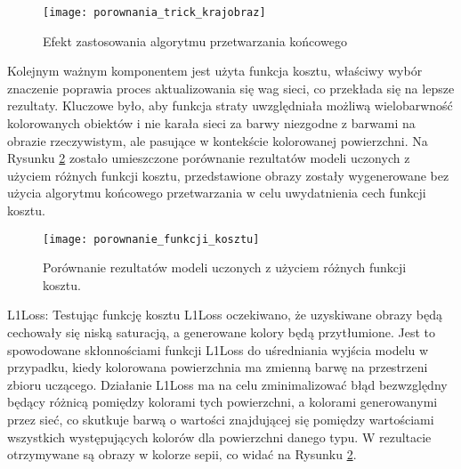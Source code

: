   \begin{figure}[H]
   \centering
   \captionsetup{justification=centering}
   \texttt{[image: porownania\_trick\_krajobraz]}
   \caption[Efekt zastosowania algorytmu przetwarzania końcowego - źródło
   rysunek własny na podstawie: \url{https://pl.wikipedia.org/wiki/Plik:PL_Bagno_Calowanie_2.jpg}]
   {Efekt zastosowania algorytmu przetwarzania końcowego}
   \label{fig:trick}
  \end{figure}

  Kolejnym ważnym komponentem jest użyta funkcja kosztu, właściwy wybór
  znaczenie poprawia proces aktualizowania się wag sieci, co przekłada się
  na lepsze rezultaty. Kluczowe było, aby funkcja straty uwzględniała
  możliwą wielobarwność kolorowanych obiektów i nie karała sieci za barwy niezgodne
  z barwami na obrazie rzeczywistym, ale pasujące w kontekście kolorowanej
  powierzchni. Na Rysunku \ref{fig:porownanie_funkcji_kosztu} zostało
  umieszczone porównanie rezultatów modeli uczonych z użyciem różnych funkcji
  kosztu, przedstawione obrazy zostały wygenerowane bez użycia algorytmu
  końcowego przetwarzania w celu uwydatnienia cech funkcji kosztu.

  \begin{figure}[H]
   \centering
   \captionsetup{justification=centering}
   \texttt{[image: porownanie\_funkcji\_kosztu]}
   \caption[Porównanie rezultatów modeli uczonych z użyciem różnych funkcji
   kosztu - źródło rysunek własny na podstawie: \url{https://cdn.thearthunters.com/wp-content/uploads/2013/06/bg-960x636.jpg}]
   {Porównanie rezultatów modeli uczonych z użyciem różnych funkcji
   kosztu.}
   \label{fig:porownanie_funkcji_kosztu}
  \end{figure}

  \noindent
  L1Loss: Testując funkcję kosztu L1Loss oczekiwano, że uzyskiwane obrazy będą
  cechowały się niską saturacją, a generowane kolory będą przytłumione. Jest
  to spowodowane skłonnościami funkcji L1Loss do uśredniania wyjścia modelu w
  przypadku, kiedy kolorowana powierzchnia ma zmienną barwę na przestrzeni
  zbioru uczącego. Działanie L1Loss ma na celu zminimalizować błąd bezwzględny
  będący różnicą pomiędzy kolorami tych powierzchni, a kolorami generowanymi
  przez sieć, co skutkuje barwą o wartości znajdującej się pomiędzy wartościami
  wszystkich występujących kolorów dla powierzchni danego typu. W rezultacie
  otrzymywane są obrazy w kolorze sepii, co widać na Rysunku
  \ref{fig:porownanie_funkcji_kosztu}.

